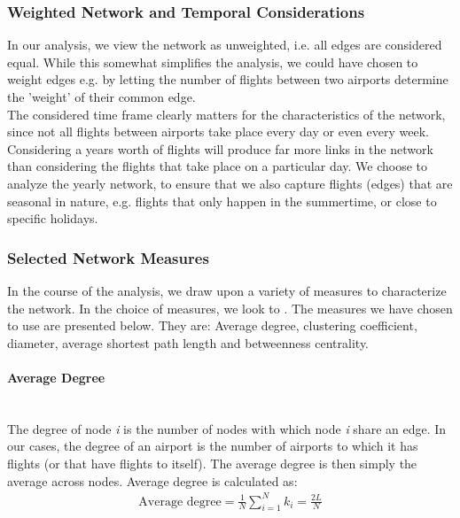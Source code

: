 \subsubsection{Weighted Network and Temporal Considerations}
In our analysis, we view the network as unweighted, i.e. all edges are considered equal. While this somewhat simplifies the analysis, we could have chosen to weight edges e.g. by letting the number of flights between two airports determine the 'weight' of their common edge. 
\medskip \\
The considered time frame clearly matters for the characteristics of the network, since not all flights between airports take place every day or even every week. Considering a years worth of flights will produce far more links in the network than considering the flights that take place on a particular day. We choose to analyze the yearly network, to ensure that we also capture flights (edges) that are seasonal in nature, e.g. flights that only happen in the summertime, or close to specific holidays. 

\subsubsection{Selected Network Measures}
In the course of the analysis, we draw upon a variety of measures to characterize the network. In the choice of measures, we look to \citet{chi2004structural}. The measures we have chosen to use are presented below. They are: Average degree, clustering coefficient, diameter, average shortest path length and betweenness centrality.


\paragraph{Average Degree}\mbox{} \\

The degree of node \textit{i} is the number of nodes with which node \textit{i} share an edge. In our cases, the degree of an airport is the number of airports to which it has flights (or that have flights to itself). 
The average degree is then simply the average across nodes. Average degree is calculated as: 
\begin{align}
    \text{Average degree} = \frac{1}{N} \sum_{i = 1}^N k_i = \frac{2L}{N}
\end{align}
\medskip
